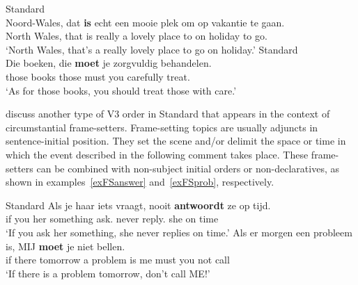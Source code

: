 \documentclass[output=paper]{langsci/langscibook}
\begin{document}
\ea
    \ea Standard \\
    \gll\label{exHT-NW}Noord-Wales, dat \textbf{is} echt een mooie plek om op vakantie te gaan.\\
    {North Wales}, that is really a lovely place to on holiday to go.\Inf{}\\
    \trans \enquote*{North Wales, that}s a really lovely place to go on holiday.'
    \newpage
    \ex Standard \\
    \gll\label{exHT-boeken}Die boeken, die \textbf{moet} je zorgvuldig behandelen.\\
    those books those must you carefully treat.\Inf{}\\
    \trans \enquote*{As for those books, you should treat those with care.}
    \z
\z

\noindent \citet{GrecoHaegeman2020} discuss another type of V3 order in Standard  that appears in the context of
circumstantial frame-setters.  Frame-setting topics are usually adjuncts in
sentence-initial position. They set the scene and/or delimit the space or time
in which the event described in the following comment takes place. These
frame-setters can be combined with non-subject initial orders or
non-declaratives, as shown in examples~\eqref{exFSanswer} and~\eqref{exFSprob},
respectively.

\ea Standard 
    \ea
    \gll\label{exFSanswer}Als je haar iets vraagt, nooit \textbf{antwoordt} ze op tijd.\\
    if you her something ask.\Ssg{} never reply.\Tsg{} she on time\\
    \trans \enquote*{If you ask her something, she never replies on time.}
    \ex
    \gll\label{exFSprob}Als er morgen een probleem is, MIJ \textbf{moet} je niet bellen.\\
    if there tomorrow a problem is me must you not call\\
    \trans \enquote*{If there is a problem tomorrow, don't call ME!}
    \z
\z
\end{document}
